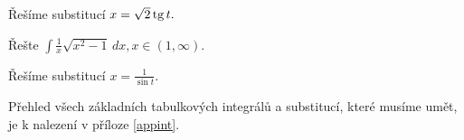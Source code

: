 \begin{reseni}
Řešíme substitucí $x=\sqrt{2}\operatorname{tg} t. $
\end{reseni}

\begin{priklad}
Řešte $\int \frac{1}{x}\sqrt{x^2-1}\, dx, x \in (1,\infty). $
\end{priklad}

\begin{reseni}
Řešíme substitucí $x=\frac{1}{\sin t}.$
\end{reseni}

\begin{pozn}
    Přehled všech základních tabulkových integrálů a substitucí, které musíme umět, je
    k nalezení v příloze \ref{appint}.
\end{pozn}
